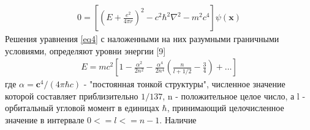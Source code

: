 \documentclass[a4paper,14pt]{article}
\theoremstyle{plain} %
\theoremstyle{definition} %
\theoremstyle{remark} %
\begin{document}
{\begin{align}
0=\left[\left(E+\frac{e^{2}}{4 \pi r}\right)^{2}-c^{2} \hbar^{2} \nabla^{2}-m^{2} c^{4}\right] \psi(\mathbf{x})
\end{align}
Решения уравнения \ref{eq4} с наложенными на них разумными граничными условиями, определяют уровни энергии [9]
\begin{align}\label{eq5}
E=m c^{2}\left[1-\frac{\alpha^{2}}{2 n^{2}}-\frac{\alpha^{4}}{2 n^{4}}\left(\frac{n}{l+1 / 2}-\frac{3}{4}\right)+\ldots\right]
\end{align}
где $\alpha=\mathbf{c}^{4}/(4\pi\hbar c)$ - "постоянная тонкой структуры", численное значение которой составляет приблизительно $1/137$, n - положительное целое число, а l - орбитальный угловой момент в единицах $\hbar$, принимающий целочисленное значение в интервале $0<=l<=n-1$. Наличие}
\end{document}
